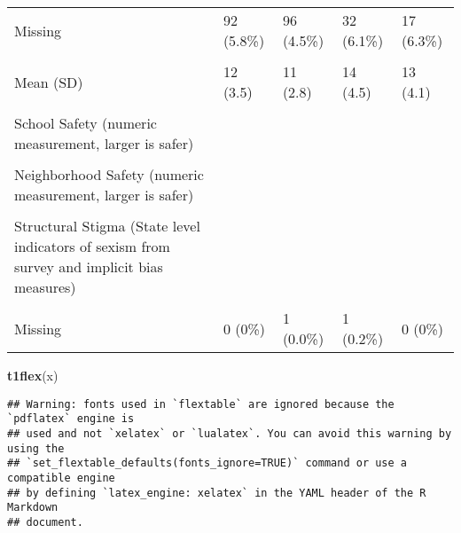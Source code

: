 \documentclass[
]{article}
\newenvironment{Shaded}{\begin{snugshade}}{\end{snugshade}}
\newcommand{\FunctionTok}[1]{\textcolor[rgb]{0.13,0.29,0.53}{\textbf{#1}}}
\newcommand{\NormalTok}[1]{#1}
\begin{document}
\begin{table}
\begin{tabular}[t]{lllll}
Missing & 92 (5.8\%) & 96 (4.5\%) & 32 (6.1\%) & 17 (6.3\%)\\
\cellcolor{gray!10}{Peer Victimization (numeric measurement, larger is more severe)} & \cellcolor{gray!10}{} & \cellcolor{gray!10}{} & \cellcolor{gray!10}{} & \cellcolor{gray!10}{}\\
\addlinespace
Mean (SD) & 12 (3.5) & 11 (2.8) & 14 (4.5) & 13 (4.1)\\
\cellcolor{gray!10}{Missing} & \cellcolor{gray!10}{5 (0.3\%)} & \cellcolor{gray!10}{26 (1.2\%)} & \cellcolor{gray!10}{1 (0.2\%)} & \cellcolor{gray!10}{2 (0.7\%)}\\
School Safety (numeric measurement, larger is safer) &  &  &  & \\
\cellcolor{gray!10}{Mean (SD)} & \cellcolor{gray!10}{19 (2.0)} & \cellcolor{gray!10}{21 (1.7)} & \cellcolor{gray!10}{19 (2.1)} & \cellcolor{gray!10}{21 (1.7)}\\
Neighborhood Safety (numeric measurement, larger is safer) &  &  &  & \\
\addlinespace
\cellcolor{gray!10}{Mean (SD)} & \cellcolor{gray!10}{3.9 (0.80)} & \cellcolor{gray!10}{4.3 (0.71)} & \cellcolor{gray!10}{3.9 (0.80)} & \cellcolor{gray!10}{4.1 (0.76)}\\
Structural Stigma (State level indicators of sexism from survey and implicit bias measures) &  &  &  & \\
\cellcolor{gray!10}{Mean (SD)} & \cellcolor{gray!10}{-0.29 (0.86)} & \cellcolor{gray!10}{-0.20 (0.89)} & \cellcolor{gray!10}{-0.40 (0.83)} & \cellcolor{gray!10}{-0.41 (0.82)}\\
Missing & 0 (0\%) & 1 (0.0\%) & 1 (0.2\%) & 0 (0\%)\\
\bottomrule
\end{tabular}
\end{table}

\begin{Shaded}
\begin{Highlighting}[]
\FunctionTok{t1flex}\NormalTok{(x)}
\end{Highlighting}
\end{Shaded}

\begin{verbatim}
## Warning: fonts used in `flextable` are ignored because the `pdflatex` engine is
## used and not `xelatex` or `lualatex`. You can avoid this warning by using the
## `set_flextable_defaults(fonts_ignore=TRUE)` command or use a compatible engine
## by defining `latex_engine: xelatex` in the YAML header of the R Markdown
## document.
\end{verbatim}
\end{document}
